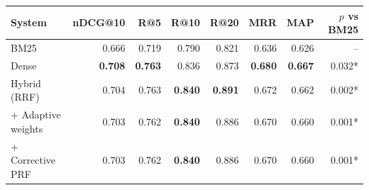 \begin{tabular}{lrrrrrrr}
\toprule
System & nDCG@10 & R@5 & R@10 & R@20 & MRR & MAP & $p$ vs BM25 \\
\midrule
BM25 & 0.666 & 0.719 & 0.790 & 0.821 & 0.636 & 0.626 & -- \\
Dense & \textbf{0.708} & \textbf{0.763} & 0.836 & 0.873 & \textbf{0.680} & \textbf{0.667} & 0.032* \\
\midrule
Hybrid (RRF) & 0.704 & 0.763 & \textbf{0.840} & \textbf{0.891} & 0.672 & 0.662 & 0.002* \\
+ Adaptive weights & 0.703 & 0.762 & \textbf{0.840} & 0.886 & 0.670 & 0.660 & 0.001* \\
+ Corrective PRF & 0.703 & 0.762 & \textbf{0.840} & 0.886 & 0.670 & 0.660 & 0.001* \\
\bottomrule
\end{tabular}
